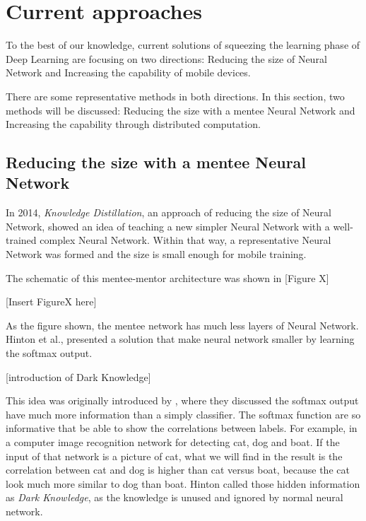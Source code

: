 \documentclass[article]{aaltoseries}
\begin{document}


\section{Current approaches}




To the best of our knowledge, current solutions of squeezing the learning phase of Deep Learning are focusing on two directions:
Reducing the size of Neural Network and Increasing the capability of mobile devices.

There are some representative methods in both directions. 
In this section, two methods will be discussed:
Reducing the size with a mentee Neural Network and Increasing the capability through distributed computation.


\subsection{Reducing the size with a mentee Neural Network}

In 2014, \emph{Knowledge Distillation}, an approach of reducing the size of Neural Network, 
showed an idea of teaching a new simpler Neural Network with a well-trained complex Neural Network.
Within that way, a representative Neural Network was formed and the size is small enough for mobile training.

The schematic of this mentee-mentor architecture was shown in [Figure X]

[Insert FigureX here]

As the figure shown, the mentee network has much less layers of Neural Network. 
Hinton et al., presented a solution that make neural network smaller by learning the 
softmax output. 

[introduction of Dark Knowledge]

This idea was originally introduced by \cite{Caruana2006}, where they discussed 
the softmax output have much more information than a simply classifier. 
The softmax function are so informative that be able to show the correlations between
labels. For example, in a computer image recognition network for detecting cat, dog and boat.
If the input of that network is a picture of cat, what we will find in the result is the correlation
between cat and dog is higher than cat versus boat, because the cat look much more similar to dog than boat.
Hinton called those hidden information as \emph{Dark Knowledge}, as the knowledge is unused and ignored by 
normal neural network.
\end{document}
